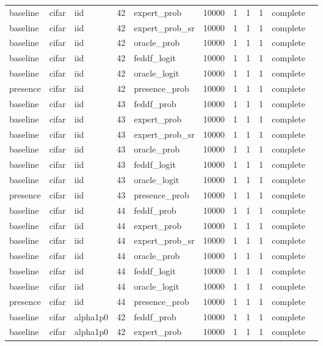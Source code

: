 \begin{tabular}{lllrlrrrrll}
baseline & cifar & iid & 42 & expert\_prob & 10000 & 1 & 1 & 1 & complete &  \\
baseline & cifar & iid & 42 & expert\_prob\_sr & 10000 & 1 & 1 & 1 & complete &  \\
baseline & cifar & iid & 42 & oracle\_prob & 10000 & 1 & 1 & 1 & complete &  \\
baseline & cifar & iid & 42 & feddf\_logit & 10000 & 1 & 1 & 1 & complete &  \\
baseline & cifar & iid & 42 & oracle\_logit & 10000 & 1 & 1 & 1 & complete &  \\
presence & cifar & iid & 42 & presence\_prob & 10000 & 1 & 1 & 1 & complete &  \\
baseline & cifar & iid & 43 & feddf\_prob & 10000 & 1 & 1 & 1 & complete &  \\
baseline & cifar & iid & 43 & expert\_prob & 10000 & 1 & 1 & 1 & complete &  \\
baseline & cifar & iid & 43 & expert\_prob\_sr & 10000 & 1 & 1 & 1 & complete &  \\
baseline & cifar & iid & 43 & oracle\_prob & 10000 & 1 & 1 & 1 & complete &  \\
baseline & cifar & iid & 43 & feddf\_logit & 10000 & 1 & 1 & 1 & complete &  \\
baseline & cifar & iid & 43 & oracle\_logit & 10000 & 1 & 1 & 1 & complete &  \\
presence & cifar & iid & 43 & presence\_prob & 10000 & 1 & 1 & 1 & complete &  \\
baseline & cifar & iid & 44 & feddf\_prob & 10000 & 1 & 1 & 1 & complete &  \\
baseline & cifar & iid & 44 & expert\_prob & 10000 & 1 & 1 & 1 & complete &  \\
baseline & cifar & iid & 44 & expert\_prob\_sr & 10000 & 1 & 1 & 1 & complete &  \\
baseline & cifar & iid & 44 & oracle\_prob & 10000 & 1 & 1 & 1 & complete &  \\
baseline & cifar & iid & 44 & feddf\_logit & 10000 & 1 & 1 & 1 & complete &  \\
baseline & cifar & iid & 44 & oracle\_logit & 10000 & 1 & 1 & 1 & complete &  \\
presence & cifar & iid & 44 & presence\_prob & 10000 & 1 & 1 & 1 & complete &  \\
baseline & cifar & alpha1p0 & 42 & feddf\_prob & 10000 & 1 & 1 & 1 & complete &  \\
baseline & cifar & alpha1p0 & 42 & expert\_prob & 10000 & 1 & 1 & 1 & complete &  \\

\end{tabular}
